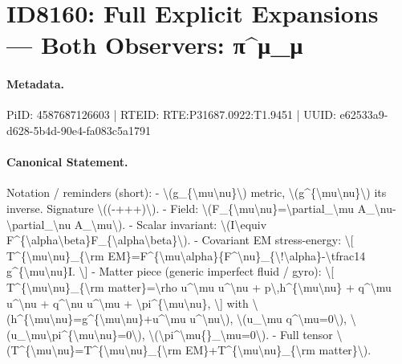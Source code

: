 \section*{ID8160: Full Explicit Expansions — Both Observers: π\textasciicircum{}μ\_μ}
\paragraph{Metadata.}
PiID: 4587687126603 | RTEID: RTE:P31687.0922:T1.9451 | UUID: e62533a9-d628-5b4d-90e4-fa083c5a1791

\paragraph{Canonical Statement.}
Notation / reminders (short): - \textbackslash{}(g\_\{\textbackslash{}mu\textbackslash{}nu\}\textbackslash{}) metric, \textbackslash{}(g\textasciicircum{}\{\textbackslash{}mu\textbackslash{}nu\}\textbackslash{}) its inverse. Signature \textbackslash{}((-+++)\textbackslash{}). - Field: \textbackslash{}(F\_\{\textbackslash{}mu\textbackslash{}nu\}=\textbackslash{}partial\_\textbackslash{}mu A\_\textbackslash{}nu-\textbackslash{}partial\_\textbackslash{}nu A\_\textbackslash{}mu\textbackslash{}). - Scalar invariant: \textbackslash{}(I\textbackslash{}equiv F\textasciicircum{}\{\textbackslash{}alpha\textbackslash{}beta\}F\_\{\textbackslash{}alpha\textbackslash{}beta\}\textbackslash{}). - Covariant EM stress-energy: \textbackslash{}[ T\textasciicircum{}\{\textbackslash{}mu\textbackslash{}nu\}\_\{\textbackslash{}rm EM\}=F\textasciicircum{}\{\textbackslash{}mu\textbackslash{}alpha\}\{F\textasciicircum{}\textbackslash{}nu\}\_\{\textbackslash{}!\textbackslash{}alpha\}-\textbackslash{}tfrac14 g\textasciicircum{}\{\textbackslash{}mu\textbackslash{}nu\}I. \textbackslash{}] - Matter piece (generic imperfect fluid / gyro): \textbackslash{}[ T\textasciicircum{}\{\textbackslash{}mu\textbackslash{}nu\}\_\{\textbackslash{}rm matter\}=\textbackslash{}rho u\textasciicircum{}\textbackslash{}mu u\textasciicircum{}\textbackslash{}nu + p\textbackslash{},h\textasciicircum{}\{\textbackslash{}mu\textbackslash{}nu\} + q\textasciicircum{}\textbackslash{}mu u\textasciicircum{}\textbackslash{}nu + q\textasciicircum{}\textbackslash{}nu u\textasciicircum{}\textbackslash{}mu + \textbackslash{}pi\textasciicircum{}\{\textbackslash{}mu\textbackslash{}nu\}, \textbackslash{}] with \textbackslash{}(h\textasciicircum{}\{\textbackslash{}mu\textbackslash{}nu\}=g\textasciicircum{}\{\textbackslash{}mu\textbackslash{}nu\}+u\textasciicircum{}\textbackslash{}mu u\textasciicircum{}\textbackslash{}nu\textbackslash{}), \textbackslash{}(u\_\textbackslash{}mu q\textasciicircum{}\textbackslash{}mu=0\textbackslash{}), \textbackslash{}(u\_\textbackslash{}mu\textbackslash{}pi\textasciicircum{}\{\textbackslash{}mu\textbackslash{}nu\}=0\textbackslash{}), \textbackslash{}(\textbackslash{}pi\textasciicircum{}\textbackslash{}mu\{\}\_\textbackslash{}mu=0\textbackslash{}). - Full tensor \textbackslash{}(T\textasciicircum{}\{\textbackslash{}mu\textbackslash{}nu\}=T\textasciicircum{}\{\textbackslash{}mu\textbackslash{}nu\}\_\{\textbackslash{}rm EM\}+T\textasciicircum{}\{\textbackslash{}mu\textbackslash{}nu\}\_\{\textbackslash{}rm matter\}\textbackslash{}).

